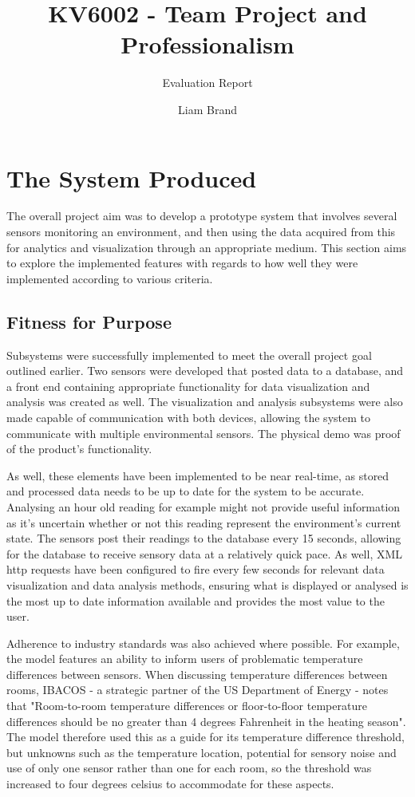\documentclass[]{report}
\title{KV6002 - Team Project and Professionalism}
\subtitle{Evaluation Report}
\author{Liam Brand}
\date{}
\begin{document}
\maketitle

\section{The System Produced}
The overall project aim was to develop a prototype system that involves several sensors monitoring an environment, and then using the data acquired from this for analytics and visualization through an appropriate medium. This section aims to explore the implemented features with regards to how well they were implemented according to various criteria.

	\subsection{Fitness for Purpose}
	Subsystems were successfully implemented to meet the overall project goal outlined earlier. Two sensors were developed that posted data to a database, and a front end containing appropriate functionality for data visualization and analysis was created as well. The visualization and analysis subsystems were also made capable of communication with both devices, allowing the system to communicate with multiple environmental sensors. The physical demo was proof of the product's functionality.
	
	As well, these elements have been implemented to be near real-time, as stored and processed data needs to be up to date for the system to be accurate. Analysing an hour old reading for example might not provide useful information as it's uncertain whether or not this reading represent the environment's current state. The sensors post their readings to the database every 15 seconds, allowing for the database to receive sensory data at a relatively quick pace. As well, XML http requests have been configured to fire every few seconds for relevant data visualization and data analysis methods, ensuring what is displayed or analysed is the most up to date information available and provides the most value to the user.
	
	Adherence to industry standards was also achieved where possible. For example, the model features an ability to inform users of problematic temperature differences between sensors. When discussing temperature differences between rooms, IBACOS - a strategic partner of the US Department of Energy - notes that "Room-to-room temperature differences or floor-to-floor temperature differences should be no greater than 4 degrees Fahrenheit in the heating season"\cite{burdick2011advanced}. The model therefore used this as a guide for its temperature difference threshold, but unknowns such as the temperature location, potential for sensory noise and use of only one sensor rather than one for each room, so the threshold was increased to four degrees celsius to accommodate for these aspects.
	
\end{document}
